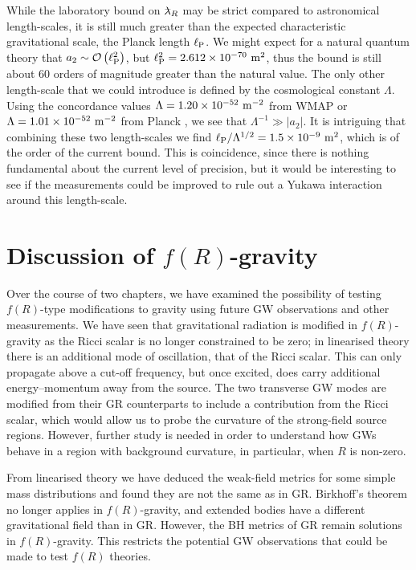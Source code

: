 While the laboratory bound on $\lambdabar_R$ may be strict compared to astronomical length-scales, it is still much greater than the expected characteristic gravitational scale, the Planck length $\ell_\mathrm{P}$. We might expect for a natural quantum theory that $a_2 \sim \mathcal{O}\left({\ell_\mathrm{P}^2}\right)$, but $\ell_\mathrm{P}^2 = 2.612 \times 10^{-70}~\mathrm{m^2}$, thus the bound is still about $60$ orders of magnitude greater than the natural value. The only other length-scale that we could introduce is defined by the cosmological constant $\Lambda$. Using the concordance values $\Lambda = 1.20 \times 10^{-52}~\mathrm{m^{-2}}$ from WMAP \citep{Bennett2012, Hinshaw2012} or $\Lambda = 1.01 \times 10^{-52}~\mathrm{m^{-2}}$ from Planck \citep{Ade2013a,Ade2013b}, we see that $\Lambda^{-1} \gg |a_2|$. It is intriguing that combining these two length-scales we find ${\ell_\mathrm{P}}/{\Lambda^{1/2}} = 1.5 \times 10^{-9}~\mathrm{m^2}$, which is of the order of the current bound. This is coincidence, since there is nothing fundamental about the current level of precision, but it would be interesting to see if the measurements could be improved to rule out a Yukawa interaction around this length-scale. %

\section{Discussion of $f(R)$-gravity}\label{sec:f_Discuss}

Over the course of two chapters, we have examined the possibility of testing $f(R)$-type modifications to gravity using future GW observations and other measurements. We have seen that gravitational radiation is modified in $f(R)$-gravity as the Ricci scalar is no longer constrained to be zero; in linearised theory there is an additional mode of oscillation, that of the Ricci scalar. This can only propagate above a cut-off frequency, but once excited, does carry additional energy--momentum away from the source. The two transverse GW modes are modified from their GR counterparts to include a contribution from the Ricci scalar, which would allow us to probe the curvature of the strong-field source regions. However, further study is needed in order to understand how GWs behave in a region with background curvature, in particular, when $R$ is non-zero.

From linearised theory we have deduced the weak-field metrics for some simple mass distributions and found they are not the same as in GR. Birkhoff's theorem no longer applies in $f(R)$-gravity, and extended bodies have a different gravitational field than in GR. However, the BH metrics of GR remain solutions in $f(R)$-gravity. This restricts the potential GW observations that could be made to test $f(R)$ theories.

